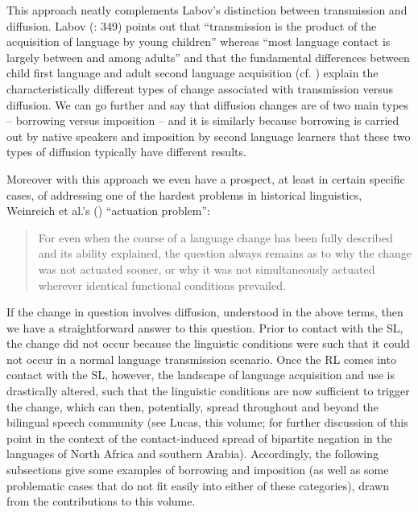 \documentclass[output=paper]{langsci/langscibook}
\begin{document}
This approach neatly complements Labov's distinction between transmission and diffusion. Labov (\citeyear{Labov2007}: 349) points out that ``transmission is the product of the acquisition of language by young children'' whereas ``most language contact is largely between and among adults'' and that the fundamental differences between child first language and adult second language acquisition (cf. \citealt{BleyVroman1989,BleyVroman2009,Meisel2011}) explain the characteristically different types of change associated with transmission versus diffusion. We can go further and say that diffusion changes are of two main types -- borrowing versus imposition -- and it is similarly because borrowing is carried out by native speakers and imposition by second language learners that these two types of diffusion typically have different results.

Moreover with this approach we even have a prospect, at least in certain specific cases, of addressing one of the hardest problems in historical linguistics, Weinreich et al.'s  (\citeyear{WeinreichLabovHerzog1968}) ``actuation problem'':

\begin{quote}
For even when the course of a  language change has been fully described and its ability explained, the question always remains as to why the change was not actuated sooner, or why it was not simultaneously actuated wherever identical functional conditions prevailed. \citep[112]{WeinreichLabovHerzog1968}
\end{quote}

\noindent If the change in question involves diffusion, understood in the above terms, then we have a straightforward answer to this question. Prior to contact with the SL, the change did not occur because the linguistic conditions were such that it could not occur in a normal language transmission scenario. Once the RL comes into contact with the SL, however, the landscape of language acquisition and use is drastically altered, such that the linguistic conditions are now sufficient to trigger the change, which can then, potentially, spread throughout and beyond the bilingual speech community (see Lucas, this volume; \citealt{LucasLash2010} for further discussion of this point in the context of the contact-induced spread of bipartite negation in the languages of North Africa and southern Arabia). Accordingly, the following subsections give some examples of borrowing and imposition (as well as some problematic cases that do not fit easily into either of these categories), drawn from the contributions to this volume.
\end{document}

